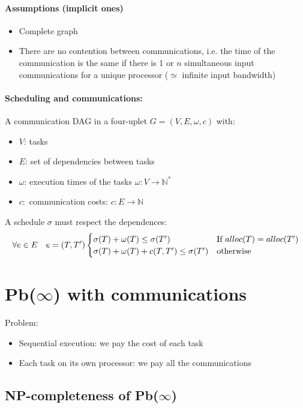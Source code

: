 \paragraph{Assumptions (implicit ones)}
\begin{itemize}
\item Complete graph
\item There are no contention between communications, i.e. the time of the communication is the same if there is 1 or $n$ simultaneous input communications for a unique processor ($\simeq$ infinite input bandwidth)
\end{itemize}

\paragraph{Scheduling and communications:} A communication DAG in a four-uplet $G=(V,E,\omega,c)$ with:
\begin{itemize}
\item $V$: tasks
\item $E$: set of dependencies between tasks
\item $\omega$: execution times of the tasks $\omega: V \to \mathbb{N}^*$
\item $c:$ communication costs: $c:E\to \mathbb{N}$
\end{itemize}


A schedule $\sigma$ must respect the dependences:
\[
\forall e \in E \quad e=(T,T') 
\begin{cases}
\sigma(T)+\omega(T)\leq \sigma(T') & $If $alloc(T)=alloc(T')\\
\sigma(T) + \omega(T)+c(T,T')\leq \sigma(T') & $otherwise$
\end{cases}\]

\section{Pb($\infty$) with communications}
Problem:
\begin{itemize}
\item Sequential execution: we pay the cost of each task
\item Each task on its own processor: we pay all the communications
\end{itemize}

\subsection{NP-completeness of Pb($\infty$)}
